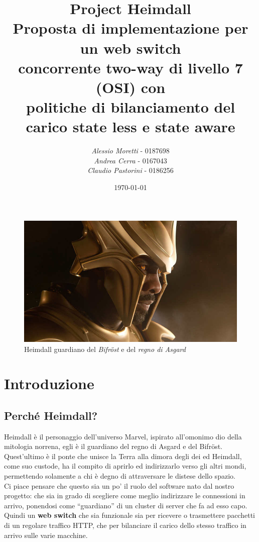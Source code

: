 \documentclass[italian]{tktltiki2}
\title{%
    \huge Project Heimdall 
    \\
    \large Proposta di implementazione per un web switch 
    \\
    concorrente two-way di livello 7 (OSI) con
    \\
    politiche di bilanciamento del carico state less e state aware
  }
\author{\emph{Alessio Moretti} - 0187698
    \\
    \emph{Andrea Cerra} - 0167043
    \\
    \emph{Claudio Pastorini} - 0186256}
\date{\today}
\begin{document}
\maketitle        %

\thispagestyle{empty} 
\tableofcontents  %
\thispagestyle{empty} 

\begin{figure}[H]
\centering
\includegraphics[width=\textwidth]{images/heimdall}
\caption{Heimdall guardiano del \emph{Bifröst} e del \emph{regno di Asgard}}
\end{figure}

\mainmatter       %

\newpage
\section{Introduzione}
\subsection{Perché Heimdall?}
Heimdall è il personaggio dell'universo Marvel, ispirato all'omonimo dio della mitologia norrena, egli è il guardiano del regno di Asgard e del Bifröst. Quest'ultimo è il ponte che unisce la Terra alla dimora degli dei ed Heimdall, come suo custode, ha il compito di aprirlo ed indirizzarlo verso gli altri mondi, permettendo solamente a chi è degno di attraversare le distese dello spazio.
\\
Ci piace pensare che questo sia un po' il ruolo del software nato dal nostro progetto: che sia in grado di scegliere come meglio indirizzare le connessioni in arrivo, ponendosi come ``guardiano'' di un cluster di server che fa ad esso capo. Quindi un \textbf{web switch} che sia funzionale sia per ricevere o trasmettere pacchetti di un regolare traffico HTTP, che per bilanciare il carico dello stesso traffico in arrivo sulle varie macchine.
\end{document}
